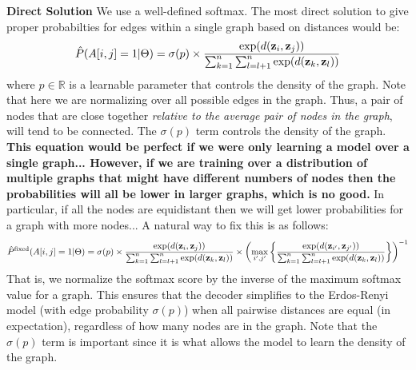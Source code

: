 \noindent
\textbf{Direct Solution} We use a well-defined softmax. The most direct solution to give proper probabilties for edges within a single graph based on distances would be:
\begin{equation}
    \hat{P}(A[i,j] = 1 | \Theta) = \sigma(p)\times\frac{\exp(d(\mathbf{z}_i, \mathbf{z}_j))}{\sum_{k=1}^{n}\sum_{l=l+1}^{n}\exp(d(\mathbf{z}_k, \mathbf{z}_l))} 
\end{equation}
where $p \in \mathbb{R}$ is a learnable parameter that controls the density of the graph.  
Note that here we are normalizing over all possible edges in the graph. 
Thus, a pair of nodes that are close together {\em relative to the average pair of nodes in the graph}, will tend to be connected. 
The $\sigma(p)$ term controls the density of the graph. 
{\bf This equation would be perfect if we were only learning a model over a single graph... However, if we are training over a distribution of multiple graphs that might have different numbers of nodes then the probabilities will all be lower in larger graphs, which is no good.}
In particular, if all the nodes are equidistant then we will get lower probabilities for a graph with more nodes...
A natural way to fix this is as follows:
\begin{equation}
    \hat{P}^{\textrm{fixed}}(A[i,j] = 1 | \Theta) = \sigma(p)\times\frac{\exp(d(\mathbf{z}_i, \mathbf{z}_j))}{\sum_{k=1}^{n}\sum_{l=l+1}^{n}\exp(d(\mathbf{z}_k, \mathbf{z}_l))} \times \left(\max_{i',j'}\left\{\frac{\exp(d(\mathbf{z}_{i'}, \mathbf{z}_{j'}))}{\sum_{k=1}^{n}\sum_{l=l+1}^{n}\exp(d(\mathbf{z}_k, \mathbf{z}_l))}\right\}\right)^{-1}
\end{equation}
That is, we normalize the softmax score by the inverse of the maximum softmax value for a graph.
This ensures that the decoder simplifies to the Erdos-Renyi model (with edge probability $\sigma(p)$) when all pairwise distances are equal (in expectation), regardless of how many nodes are in the graph.
Note that the $\sigma(p)$ term is important since it is what allows the model to learn the density of the graph. 



